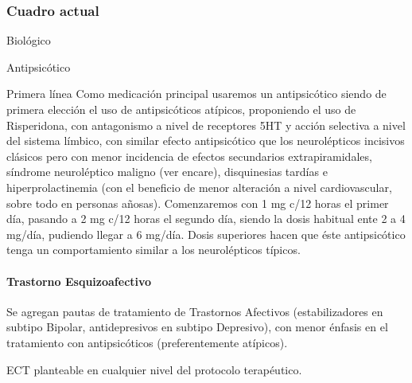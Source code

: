 \documentclass{scrbook}
\begin{document}
\subsubsection*{Cuadro actual}
Biológico

Antipsicótico

Primera línea Como medicación principal usaremos un antipsicótico siendo de primera elección el uso de antipsicóticos atípicos, proponiendo el uso de Risperidona, con antagonismo a nivel de receptores 5HT y acción selectiva a nivel del sistema límbico, con similar efecto antipsicótico que los neurolépticos incisivos clásicos pero con menor incidencia de efectos secundarios extrapiramidales, síndrome neuroléptico maligno (ver encare), disquinesias tardías e hiperprolactinemia (con el beneficio de menor alteración a nivel cardiovascular, sobre todo en personas añosas). Comenzaremos con 1 mg c/12 horas el primer día, pasando a 2 mg c/12 horas el segundo día, siendo la dosis habitual ente 2 a 4 mg/día, pudiendo llegar a 6 mg/día. Dosis superiores hacen que éste antipsicótico tenga un comportamiento similar a los neurolépticos típicos.

\paragraph{Trastorno Esquizoafectivo}
Se agregan pautas de tratamiento de Trastornos Afectivos (estabilizadores en subtipo Bipolar, antidepresivos en subtipo Depresivo), con menor énfasis en el tratamiento con antipsicóticos (preferentemente atípicos).

ECT planteable en cualquier nivel del protocolo terapéutico.
\end{document}

